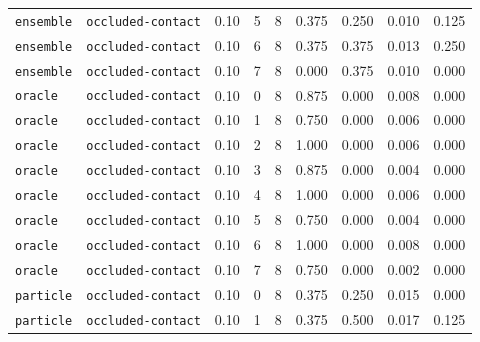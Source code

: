 \documentclass{article}
\begin{document}
\begin{center}
\begin{tabular}{llccccccc}
\texttt{ensemble} & \texttt{occluded-contact} & 0.10 & 5 & 8 & 0.375 & 0.250 & 0.010 & 0.125 \\
\texttt{ensemble} & \texttt{occluded-contact} & 0.10 & 6 & 8 & 0.375 & 0.375 & 0.013 & 0.250 \\
\texttt{ensemble} & \texttt{occluded-contact} & 0.10 & 7 & 8 & 0.000 & 0.375 & 0.010 & 0.000 \\
\texttt{oracle} & \texttt{occluded-contact} & 0.10 & 0 & 8 & 0.875 & 0.000 & 0.008 & 0.000 \\
\texttt{oracle} & \texttt{occluded-contact} & 0.10 & 1 & 8 & 0.750 & 0.000 & 0.006 & 0.000 \\
\texttt{oracle} & \texttt{occluded-contact} & 0.10 & 2 & 8 & 1.000 & 0.000 & 0.006 & 0.000 \\
\texttt{oracle} & \texttt{occluded-contact} & 0.10 & 3 & 8 & 0.875 & 0.000 & 0.004 & 0.000 \\
\texttt{oracle} & \texttt{occluded-contact} & 0.10 & 4 & 8 & 1.000 & 0.000 & 0.006 & 0.000 \\
\texttt{oracle} & \texttt{occluded-contact} & 0.10 & 5 & 8 & 0.750 & 0.000 & 0.004 & 0.000 \\
\texttt{oracle} & \texttt{occluded-contact} & 0.10 & 6 & 8 & 1.000 & 0.000 & 0.008 & 0.000 \\
\texttt{oracle} & \texttt{occluded-contact} & 0.10 & 7 & 8 & 0.750 & 0.000 & 0.002 & 0.000 \\
\texttt{particle} & \texttt{occluded-contact} & 0.10 & 0 & 8 & 0.375 & 0.250 & 0.015 & 0.000 \\
\texttt{particle} & \texttt{occluded-contact} & 0.10 & 1 & 8 & 0.375 & 0.500 & 0.017 & 0.125 \\
\bottomrule
\end{tabular}
\end{center}
\end{document}
